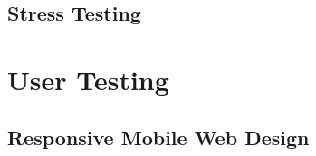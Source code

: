 \subsection{Stress Testing}


\section{User Testing}

\subsection{Responsive Mobile Web Design}
\label{testing-mobile}
